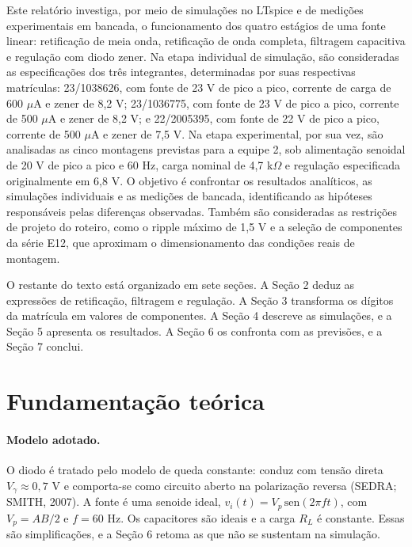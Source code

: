 \documentclass[11pt,a4paper]{article}
\begin{document}
Este relatório investiga, por meio de simulações no LTspice e de
medições experimentais em bancada, o funcionamento dos quatro
estágios de uma fonte linear: retificação de meia onda, retificação
de onda completa, filtragem capacitiva e regulação com diodo zener.
Na etapa individual de simulação, são consideradas as especificações
dos três integrantes, determinadas por suas respectivas matrículas:
23/1038626, com fonte de 23 V de pico a pico, corrente de carga de
600 $\mu\text{A}$ e zener de 8,2 V; 23/1036775, com fonte de 23 V
de pico a pico, corrente de 500 $\mu\text{A}$ e zener de 8,2 V; e
22/2005395, com fonte de 22 V de pico a pico, corrente de
500 $\mu\text{A}$ e zener de 7,5 V. Na etapa experimental, por
sua vez, são analisadas as cinco montagens previstas para a equipe 2,
sob alimentação senoidal de 20 V de pico a pico e 60 Hz, carga
nominal de 4,7 k$\Omega$ e regulação especificada originalmente em
6,8 V. O objetivo é confrontar os resultados analíticos, as
simulações individuais e as medições de bancada, identificando
as hipóteses responsáveis pelas diferenças observadas. Também são
consideradas as restrições de projeto do roteiro, como o ripple
máximo de 1,5 V e a seleção de componentes da série E12, que
aproximam o dimensionamento das condições reais de montagem.

O restante do texto está organizado em sete seções. A Seção 2 deduz as expressões de retificação, filtragem e regulação. A Seção 3 transforma os dígitos da matrícula em valores de componentes. A Seção 4 descreve as simulações, e a Seção 5 apresenta os resultados. A Seção 6 os confronta com as previsões, e a Seção 7 conclui.

\section{Fundamentação teórica}

\paragraph{Modelo adotado.} O diodo é tratado pelo modelo de queda constante: conduz com tensão direta $V_\gamma \approx 0{,}7\text{ V}$ e comporta-se como circuito aberto na polarização reversa (SEDRA; SMITH, 2007). A fonte é uma senoide ideal, $v_i(t) = V_p\,\mathrm{sen}(2\pi f t)$, com $V_p = AB/2$ e $f = 60\text{ Hz}$. Os capacitores são ideais e a carga $R_L$ é constante. Essas são simplificações, e a Seção 6 retoma as que não se sustentam na simulação.
\end{document}
